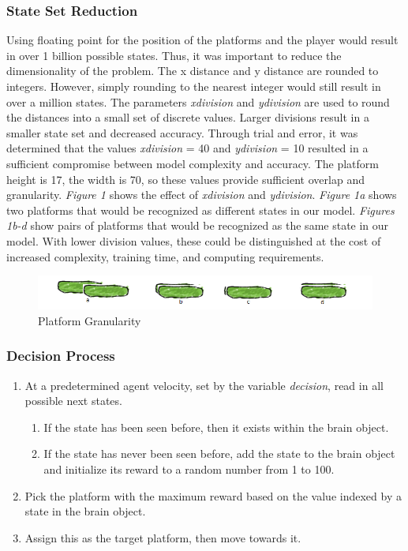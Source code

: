 \documentclass[a4paper, 12pt]{article}
\begin{document}
\subsubsection{State Set Reduction}
Using floating point for the position of the platforms and the player would result in over 1 billion possible states. Thus, it was important to reduce the dimensionality of the problem. The x distance and y distance are rounded to integers. However, simply rounding to the nearest integer would still result in over a million states. The parameters \textit{xdivision} and \textit{ydivision} are used to round the distances into a small set of discrete values. Larger divisions result in a smaller state set and decreased accuracy. Through trial and error, it was determined that the values \textit{xdivision} = 40 and \textit{ydivision} = 10 resulted in a sufficient compromise between model complexity and accuracy. The platform height is 17, the width is 70, so these values provide sufficient overlap and granularity. \textit{Figure 1} shows the effect of \textit{xdivision} and \textit{ydivision}. \textit{Figure 1a} shows two platforms that would be recognized as different states in our model. \textit{Figures 1b-d} show pairs of platforms that would be recognized as the same state in our model. With lower division values, these could be distinguished at the cost of increased complexity, training time, and computing requirements.
\begin{figure}[H]
\centering
\includegraphics[scale=0.75]{platform_overlap.png}
\caption{Platform Granularity}
\end{figure}

\subsubsection{Decision Process}
\begin{enumerate}
	\setlength{\itemsep}{0.2pt}
	\item At a predetermined agent velocity, set by the variable \textit{decision}, read in all possible next states.
    	\begin{enumerate}
        	\setlength{\itemsep}{0.2pt}
        	\item If the state has been seen before, then it exists within the brain object.
            \item If the state has never been seen before, add the state to the brain object and initialize its reward to a random number from 1 to 100.

        \end{enumerate}
    \item Pick the platform with the maximum reward based on the value indexed by a state in the brain object.
    \item Assign this as the target platform, then move towards it.
\end{enumerate}
\end{document}
